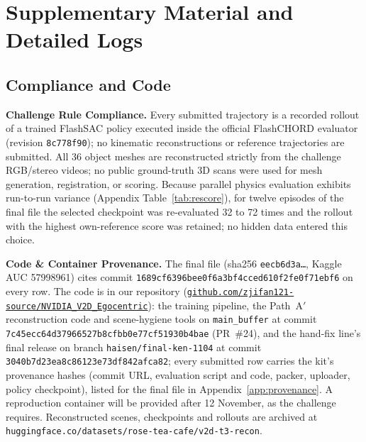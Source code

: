\documentclass[10pt]{nvidiaextabstract}
\begin{document}
\section{Supplementary Material and Detailed Logs}
\label{sec:appendix}

\subsection{Compliance and Code}
\label{sec:compliance}
\textbf{Challenge Rule Compliance.} Every submitted trajectory is a recorded rollout of a trained FlashSAC policy executed inside the official FlashCHORD evaluator (revision \texttt{8c778f90}); no kinematic reconstructions or reference trajectories are submitted. All 36 object meshes are reconstructed strictly from the challenge RGB/stereo videos; no public ground-truth 3D scans were used for mesh generation, registration, or scoring. Because parallel physics evaluation exhibits run-to-run variance (Appendix Table~\ref{tab:rescore}), for twelve episodes of the final file the selected checkpoint was re-evaluated 32 to 72 times and the rollout with the highest own-reference score was retained; no hidden data entered this choice.

\textbf{Code \& Container Provenance.} The final file (sha256 \texttt{eecb6d3a\ldots}, Kaggle AUC 57998961) cites commit \texttt{1689cf63\allowbreak 96bee0f6\allowbreak a3bf4cce\allowbreak d610f2fe\allowbreak 0f71ebf6} on every row. The code is in our repository (\href{https://github.com/zjifan121-source/NVIDIA_V2D_Egocentric}{\texttt{github.com/\allowbreak zjifan121-source/\allowbreak NVIDIA\_V2D\_Egocentric}}): the training pipeline, the Path~A$'$ reconstruction code and scene-hygiene tools on \texttt{main\_buffer} at commit \texttt{7c45ecc6\allowbreak 4d379665\allowbreak 27b8cfbb\allowbreak 0e77cf51\allowbreak 930b4bae} (PR~\#24), and the hand-fix line's final release on branch \texttt{haisen/final-ken-1104} at commit \texttt{3040b7d2\allowbreak 3ea8c861\allowbreak 23e73df8\allowbreak 42afca82}; every submitted row carries the kit's provenance hashes (commit URL, evaluation script and code, packer, uploader, policy checkpoint), listed for the final file in Appendix~\ref{app:provenance}. A reproduction container will be provided after 12 November, as the challenge requires. Reconstructed scenes, checkpoints and rollouts are archived at \texttt{huggingface.co/\allowbreak datasets/\allowbreak rose-tea-cafe/\allowbreak v2d-t3-recon}.
\end{document}

